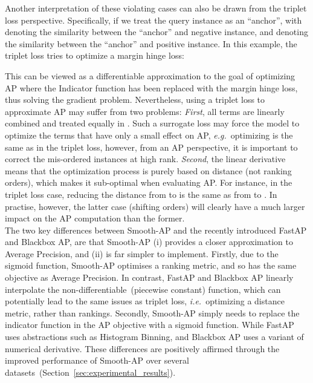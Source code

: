 \documentclass[runningheads]{llncs}
\providecommand{\ie}[0]{\emph{i.e.}}
\providecommand{\eg}[0]{\emph{e.g.}}
\begin{document}
Another interpretation of these violating cases can also be drawn from the triplet loss perspective.
Specifically, if we treat the query instance as an ``anchor'', with
 denoting the similarity between the ``anchor'' and negative instance,
and  denoting the similarity between the ``anchor'' and positive instance.
In this example, the triplet loss tries to optimize a margin hinge loss: 

This can be viewed as a differentiable approximation to the goal of optimizing AP where the Indicator function has been replaced with the margin hinge loss, thus solving the gradient problem.
Nevertheless, 
using a triplet loss to approximate AP may suffer from two problems:
\emph{First},
all terms are linearly combined and treated equally in . 
Such a surrogate loss may force the model to optimize the terms that have only a small effect on  AP,
\eg\ optimizing  is the same as  in the triplet loss, 
however, from an AP perspective, 
it is important to correct the mis-ordered instances at high rank.
\emph{Second}, 
the linear derivative means that the optimization process is  purely based on distance (not ranking orders), 
which makes it sub-optimal when evaluating AP. 
For instance, in the triplet loss case, 
reducing the distance  from  to  is the same as from  to . 
In practise, however, the latter case (shifting orders) will clearly have a much larger 
impact on the AP computation than the former.\\


The two key differences between Smooth-AP 
and the recently introduced FastAP and Blackbox AP,
are that Smooth-AP (i) provides a closer approximation to Average Precision, 
and (ii) is far simpler to implement. 
Firstly, due to the sigmoid function, Smooth-AP optimises a ranking metric, 
and so has the same objective as Average Precision.
In contrast, 
FastAP and Blackbox AP linearly interpolate the non-differentiable~(piecewise constant) function,
which can potentially lead to the same issues as triplet loss, \ie~optimizing a distance metric, rather than rankings.
Secondly, Smooth-AP simply needs to replace the indicator function in the AP objective with a sigmoid function. 
While FastAP uses abstractions such as Histogram Binning, and Blackbox AP uses a variant of numerical derivative.
These differences are positively affirmed through the improved performance of Smooth-AP over several datasets~(Section~\ref{sec:experimental_results}).
\end{document}
